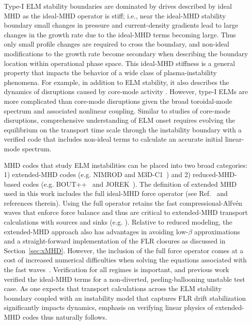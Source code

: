 Type-I ELM stability boundaries are dominated by drives described by ideal MHD
as the ideal-MHD operator is stiff; i.e., near the ideal-MHD stability boundary
small changes in pressure and current-density gradients lead to large changes
in the growth rate due to the ideal-MHD terms becoming large. Thus only small
profile changes are required to cross the boundary, and non-ideal modifications
to the growth rate become secondary when describing the boundary location
within operational phase space. This ideal-MHD stiffness is a general property
that impacts the behavior of a wide class of plasma-instability phenomena.  For
example, in addition to ELM stability, it also describes the dynamics of
disruptions caused by core-mode activity \cite{callen99,kruger05}.  However,
type-I ELMs are more complicated than core-mode disruptions given the broad
toroidal-mode spectrum and associated nonlinear coupling. Similar to studies of
core-mode disruptions, comprehensive understanding of ELM onset requires
evolving the equilibrium on the transport time scale through the instability
boundary with a verified code that includes non-ideal terms to calculate an
accurate initial linear-mode spectrum.


MHD codes that study ELM instabilities can be placed into two broad
categories: 1) extended-MHD codes (e.g. NIMROD and
M3D-C1~\cite{jardin2007high}) and 2) reduced-MHD-based codes (e.g.
BOUT++~\cite{dudson2009bout} and JOREK~\cite{huysmans2009non}).  The
definition of extended MHD used in this work includes the full ideal-MHD
force operator (see Ref.~\cite{Schnack:2006kx} and references therein).
Using the full operator retains the fast compressional-Alfvén waves that
enforce force balance and thus are critical to extended-MHD transport
calculations with sources and sinks (e.g. \cite{Jenkins10}).  Relative to
reduced modeling, the extended-MHD approach also has advantages in
avoiding low-$\beta$ approximations and a straight-forward
implementation of the FLR closures as discussed in
Section~\ref{sec:xMHD}.  However, the inclusion of the full force
operator comes at a cost of increased numerical difficulties when
solving the equations associated with the fast
waves~\cite{gruber2012finite, degtyarev1986methods,
bondeson1991tunable,lutjens1996class, Sovinec15}.   Verification for all
regimes is important, and previous work~\cite{Burke10} verified the ideal-MHD
terms for a non-diverted, peeling-ballooning unstable test case.  As one
expects that transport calculations across the ELM stability boundary coupled
with an instability model that captures FLR drift stabilization significantly
impacts dynamics, emphasis on verifying linear physics of extended-MHD codes
thus naturally follows.

